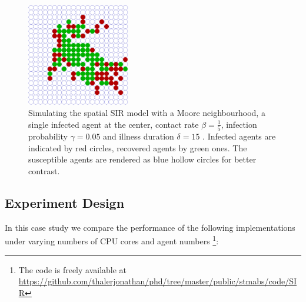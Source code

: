 \begin{figure}
	\centering
	\includegraphics[width=0.4\textwidth, angle=0]{./fig/sir/vis/SIR_Dunai_dt001_environment.png}
	\caption{Simulating the spatial SIR model with a Moore neighbourhood, a single infected agent at the center, contact rate $\beta = \frac{1}{5}$, infection probability $\gamma = 0.05$ and illness duration $\delta = 15$ . Infected agents are indicated by red circles, recovered agents by green ones. The susceptible agents are rendered as blue hollow circles for better contrast.}
	\label{fig:vis_sir}
\end{figure}

\subsection{Experiment Design}
In this case study we compare the performance of the following implementations under varying numbers of CPU cores and agent numbers \footnote{The code is freely available at \url{https://github.com/thalerjonathan/phd/tree/master/public/stmabs/code/SIR}}:

